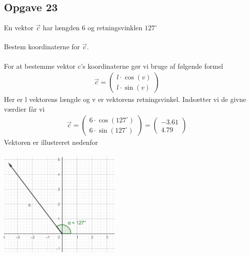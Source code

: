 \subsection{Opgave 23}

En vektor $\Vec{c}$ har længden 6 og retningsvinklen $127^{\circ}$\\\\
Bestem koordinaterne for $\Vec{c}$.\\\\

\ans
For at bestemme vektor c's koordinaterne gør vi bruge af følgende formel
\begin{align*}
    \Vec{c} = \begin{pmatrix}l\cdot \cos(v) \\ l\cdot \sin(v)\end{pmatrix}
\end{align*}
Her er l vektorens længde og v er vektorens retningsvinkel. Indsætter vi de givne værdier får vi
\begin{align*}
    \Vec{c} = \begin{pmatrix}6\cdot \cos(127^{\circ}) \\ 6\cdot \sin(127^{\circ})\end{pmatrix} = \begin{pmatrix}-3.61 \\ 4.79\end{pmatrix}
\end{align*}
Vektoren er illustreret nedenfor\\\\
\includegraphics[width = 6cm]{Opgave_21-30/Opgave_23/23.jpg}